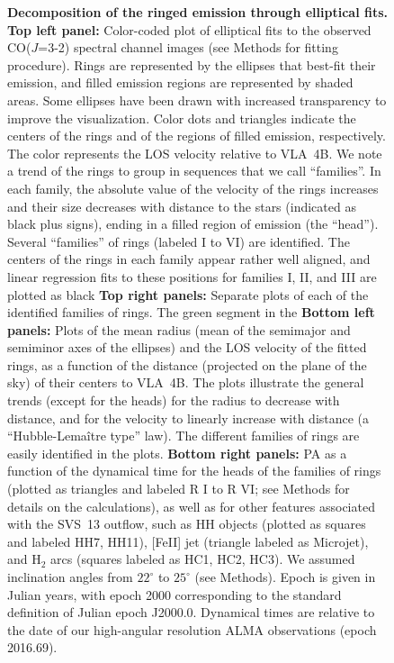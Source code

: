 \documentclass[12pt]{mythesis}
\begin{document}
\begin{figure}[p!]
\clearpage
\noindent
\caption[Figure 3 name]{{\bf Decomposition of the ringed emission through elliptical fits.} 
{\bf Top left panel:} Color-coded plot of elliptical fits to the observed CO($J$=3-2) spectral channel images (see Methods for fitting procedure). Rings are represented by the ellipses that best-fit their emission, and filled emission regions are represented by shaded areas. 
Some ellipses have been drawn with increased transparency to improve the visualization. 
Color dots and triangles indicate the centers of the rings and of the regions of filled emission, respectively. The color represents the LOS velocity relative to VLA~4B. We note a trend of the rings to group in sequences that we call ``families''. In each family, the absolute value of the velocity of the rings increases and their size decreases with distance to the stars (indicated as black plus signs), ending in a filled region of emission (the ``head''). Several ``families'' of rings (labeled I to VI) are identified. The centers of the rings in each family appear rather well aligned, and linear regression fits to these positions for families I, II, and III are plotted as black
 {\bf Top right panels:} Separate plots of each of the identified families of rings.
 The green segment in the
 {\bf Bottom left panels:} Plots of the mean radius (mean of the semimajor and semiminor axes of the ellipses) and the LOS velocity of the fitted rings, as a function of the distance (projected on the plane of the sky) of their centers to VLA~4B. The plots illustrate the general trends (except for the heads) for the radius to decrease with distance, and for the velocity to linearly increase with distance (a ``Hubble-Lema\^itre type'' law). The different families of rings are easily identified in the plots.
 {\bf Bottom right panels:} PA as a function of the dynamical time for the heads of the families of rings (plotted as triangles and labeled R I to R VI; see Methods for details on the calculations), as well as for other features associated with the SVS~13 outflow, such as HH objects (plotted as squares and labeled HH7, HH11), [FeII] jet (triangle labeled as Microjet), and H$_2$ arcs (squares labeled as HC1, HC2, HC3). We assumed inclination angles from $22^\circ$ to $25^\circ$ (see Methods). 
 Epoch is given in Julian years, with epoch 2000 corresponding to the standard definition of Julian epoch J2000.0. Dynamical times are relative to the date of our high-angular resolution ALMA observations (epoch 2016.69).
\label{fig:ellipses}
 }
\end{figure}
\end{document}
